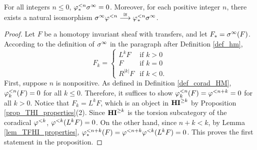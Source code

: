 \begin{prop}
For all integers $n \leq 0$, $\tlHM{n}\spectHI = 0$. Moreover,
for each positive integer $n$, there exists a natural isomorphism
$\spectHI \tlHI{n} \stackrel{\cong}{\to} \tlHM{n}\spectHI$.
\end{prop}
\begin{proof}
Let $F$ be a homotopy invariant sheaf with transfers, and let $F_*
= \spectHI(F)$. According to the definition of $\spectHI$ in the 
paragraph after Definition \ref{def_hm},
\[
F_k = \begin{cases}
L^kF &\textrm{if }k > 0\\
F &\textrm{if }k = 0\\
R^{|k|}F &\textrm{if }k < 0.
\end{cases}
\]
First, suppose $n$ is nonpositive. As defined in
Definition \ref{def_corad_HM}, $\tlHM[k]{n}(F) = 0$ for all $k \leq 0$.
Therefore, it suffices to show $\tlHM[k]{n}(F) = \tlHI{n + k} = 0$ for all $k > 0$.
Notice that $F_k = L^kF$, which is an object in $\THI{k}$ by Proposition
\ref{prop_THI_properties}(2). Since $\THI{k}$ is the torsion
subcategory of the coradical $\tlHI{k}$, $\tlHI{k}(L^kF) = 0$. On the other 
hand, since $n + k < k$, by Lemma \ref{lem_TFHI_properties}, $\tlHM{n + k}(F) = 
\tlHI{n + k}\tlHI{k}(L^kF) = 0$. This proves the first statement in the proposition.


\end{proof}
